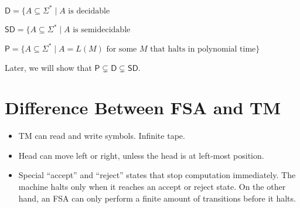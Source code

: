 $\textsf{D} = \{ A \subseteq \Sigma^* \mid \text{$A$ is decidable}$

$\textsf{SD} = \{A \subseteq \Sigma^* \mid \text{$A$ is semidecidable}$

$\textsf{P} = \{A \subseteq \Sigma^* \mid \text{$A=L(M)$ for some $M$ that halts in polynomial time} \}$

Later, we will show that $\textsf{P} \subsetneq \textsf{D} \subsetneq \textsf{SD}$.

\section{Difference Between FSA and TM}

\begin{itemize}
    \item TM can read and write symbols. Infinite tape.
    \item Head can move left or right, unless the head is at left-most position.
    \item Special ``accept'' and ``reject'' states that stop computation immediately. The machine halts only when it reaches an accept or reject state. On the other hand, an FSA can only perform a finite amount of transitions before it halts.
\end{itemize}